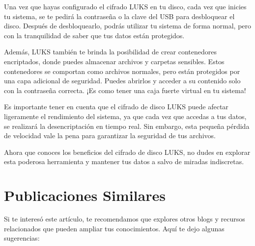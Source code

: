 \documentclass[
  jou,
  floatsintext,
  longtable,
  a4paper,
  nolmodern,
  notxfonts,
  notimes,
  12pt,
  colorlinks=true,linkcolor=blue,citecolor=blue,urlcolor=blue]{apa7}
\begin{document}
Una vez que hayas configurado el cifrado LUKS en tu disco, cada vez que
inicies tu sistema, se te pedirá la contraseña o la clave del USB para
desbloquear el disco. Después de desbloquearlo, podrás utilizar tu
sistema de forma normal, pero con la tranquilidad de saber que tus datos
están protegidos.

Además, LUKS también te brinda la posibilidad de crear contenedores
encriptados, donde puedes almacenar archivos y carpetas sensibles. Estos
contenedores se comportan como archivos normales, pero están protegidos
por una capa adicional de seguridad. Puedes abrirlos y acceder a su
contenido solo con la contraseña correcta. ¡Es como tener una caja
fuerte virtual en tu sistema!

Es importante tener en cuenta que el cifrado de disco LUKS puede afectar
ligeramente el rendimiento del sistema, ya que cada vez que accedas a
tus datos, se realizará la desencriptación en tiempo real. Sin embargo,
esta pequeña pérdida de velocidad vale la pena para garantizar la
seguridad de tus archivos.

Ahora que conoces los beneficios del cifrado de disco LUKS, no dudes en
explorar esta poderosa herramienta y mantener tus datos a salvo de
miradas indiscretas.

\section{Publicaciones Similares}\label{publicaciones-similares}

Si te interesó este artículo, te recomendamos que explores otros blogs y
recursos relacionados que pueden ampliar tus conocimientos. Aquí te dejo
algunas sugerencias:
\end{document}
